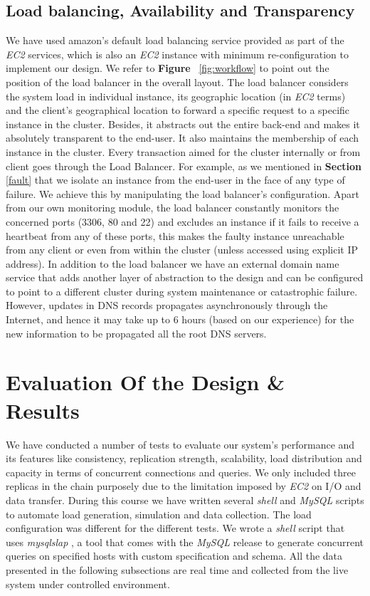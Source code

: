 \documentclass[12pt, twocolumn]{article}
\begin{document}
\subsection{Load balancing, Availability and Transparency}\label{lb.a.t}
We have used amazon's default load balancing service provided as part of the \emph{EC2} services, which is also an \emph{EC2} instance with minimum re-configuration to implement our design. We refer to \textbf{Figure }~\ref{fig:workflow} to point out the position of the load balancer in the overall layout. The load balancer considers the system load in individual instance, its geographic location (in \emph{EC2} terms) and the client's geographical location to forward a specific request to a specific instance in the cluster. Besides, it abstracts out the entire back-end and makes it absolutely transparent to the end-user. It also maintains the membership of each instance in the cluster. Every transaction aimed for the cluster internally or from client goes through the Load Balancer. For example, as we mentioned in \textbf{Section } \ref{fault} that we isolate an instance from the end-user in the face of any type of failure. We achieve this by manipulating the load balancer's configuration. Apart from our own monitoring module, the load balancer constantly monitors the concerned ports (3306, 80 and 22) and excludes an instance if it fails to receive a heartbeat from any of these ports, this makes the faulty instance unreachable from any client or even from within the cluster (unless accessed using explicit IP address). In addition to the load balancer we have an external domain name service that adds another layer of abstraction to the design and can be configured to point to a different cluster during system maintenance or catastrophic failure. However, updates in DNS records propagates asynchronously through the Internet, and hence it may take up to 6 hours (based on our experience) for the new information to be propagated all the root DNS servers.

\section{Evaluation Of the Design \& Results}
We have conducted a number of tests to evaluate our system's performance and its features like consistency, replication strength, scalability, load distribution and capacity in terms of concurrent connections and queries. We only included three replicas in the chain purposely due to the limitation imposed by \emph{EC2} \cite{freetier} on I/O and data transfer. During this course we have written several \emph{shell} and \emph{MySQL} scripts to automate load generation, simulation and data collection. The load configuration was different for the different tests. We wrote a \emph{shell} script that uses \emph{mysqlslap} \cite{mysqlslap}, a tool that comes with the \emph{MySQL} release to generate concurrent queries on specified hosts with custom specification and schema. All the data presented in the following subsections are real time and collected from the live system under controlled environment.
\end{document}

